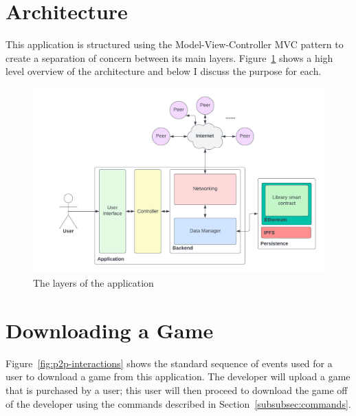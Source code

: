 \section{Architecture}

This application is structured using the Model-View-Controller MVC pattern to create a separation of concern between its main layers. Figure~\ref{fig:impl-layers} shows a high level overview of the architecture and below I discuss the purpose for each.

\begin{figure}[H]
  \centering
  \includegraphics[width=.8\textwidth]{assets/images/diagrams/layers.png}
  \caption{The layers of the application}
  \label{fig:impl-layers}
\end{figure}






\newpage

\section{Downloading a Game}

Figure~\ref{fig:p2p-interactions} shows the standard sequence of events used for a user to download a game from this application. The developer will upload a game that is purchased by a user; this user will then proceed to download the game off of the developer using the commands described in Section~\ref{subsubsec:commands}.

